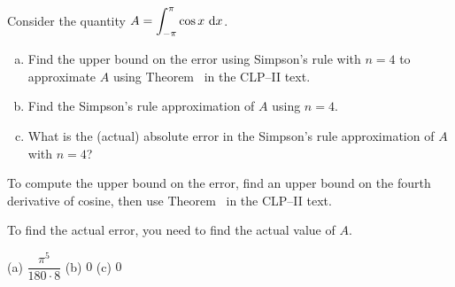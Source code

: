 \begin{Mquestion}\label{prob_s1.11:approxerror1}
Consider the quantity $A=\displaystyle\int_{-\pi}^{\pi} \cos x~\mathrm{d}x$.
\begin{enumerate}[(a)]
\item Find the upper bound on the error using Simpson's rule with $n=4$ to approximate $A$ using Theorem~ in the CLP--II text.
\item Find the Simpson's rule approximation of $A$ using $n=4$.
\item What is the (actual) absolute error in the Simpson's rule approximation of $A$ with $n=4$?
\end{enumerate}
\end{Mquestion}
\begin{hint}
To compute the upper bound on the error, find an upper bound on the fourth derivative of cosine, then use Theorem~ in the CLP--II text.

To find the actual error, you need to find the actual value of $A$.
\end{hint}
\begin{answer}
(a) $\dfrac{\pi^5}{180\cdot8}$
\qquad (b) $0$ \qquad (c) $0$
\end{answer}
